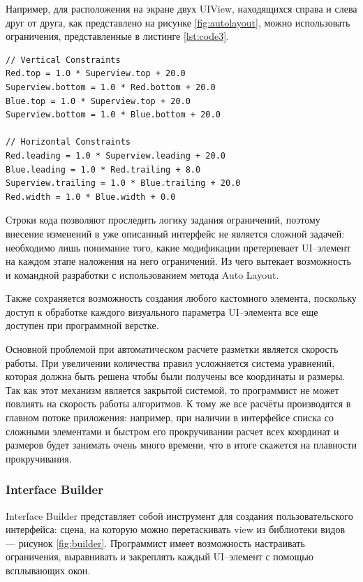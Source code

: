 Например, для расположения на экране двух UIView, находящихся справа и слева друг от друга, как представлено на рисунке \ref{fig:autolayout}, можно использовать ограничения, представленные в листинге \ref{lst:code3}.

\newpage

\begin{lstlisting}[label=lst:code3, caption=Задание параметров view]
// Vertical Constraints
Red.top = 1.0 * Superview.top + 20.0
Superview.bottom = 1.0 * Red.bottom + 20.0
Blue.top = 1.0 * Superview.top + 20.0
Superview.bottom = 1.0 * Blue.bottom + 20.0
 
// Horizontal Constraints
Red.leading = 1.0 * Superview.leading + 20.0
Blue.leading = 1.0 * Red.trailing + 8.0
Superview.trailing = 1.0 * Blue.trailing + 20.0
Red.width = 1.0 * Blue.width + 0.0
\end{lstlisting}

Строки кода позволяют проследить логику задания ограничений, поэтому внесение изменений в уже описанный интерфейс не является сложной задачей: необходимо лишь понимание того, какие модификации претерпевает UI--элемент на каждом этапе наложения на него ограничений. Из чего вытекает возможность и командной разработки с использованием метода Auto Layout.

Также сохраняется возможность создания любого кастомного элемента, поскольку доступ к обработке каждого визуального параметра UI--элемента все еще доступен при программной верстке.

Основной проблемой при автоматическом расчете разметки является скорость работы. При увеличении
количества правил усложняется система уравнений, которая должна быть решена чтобы были получены все координаты и размеры. Так как этот механизм является закрытой системой, то программист не может повлиять на скорость работы алгоритмов. К тому же все расчёты производятся в главном потоке приложения: например, при наличии в интерфейсе списка со сложными элементами и быстром его прокручивании расчет всех координат и размеров будет занимать очень много времени, что в итоге скажется на плавности прокручивания.


\subsubsection{Interface Builder}

Interface Builder \cite{interfacebuilder} представляет собой инструмент для создания пользовательского интерфейса: сцена, на которую можно перетаскивать view из библиотеки видов --- рисунок \ref{fig:builder}. 
Программист имеет возможность настраивать ограничения, выравнивать и закреплять каждый UI--элемент с помощью всплывающих окон. 

